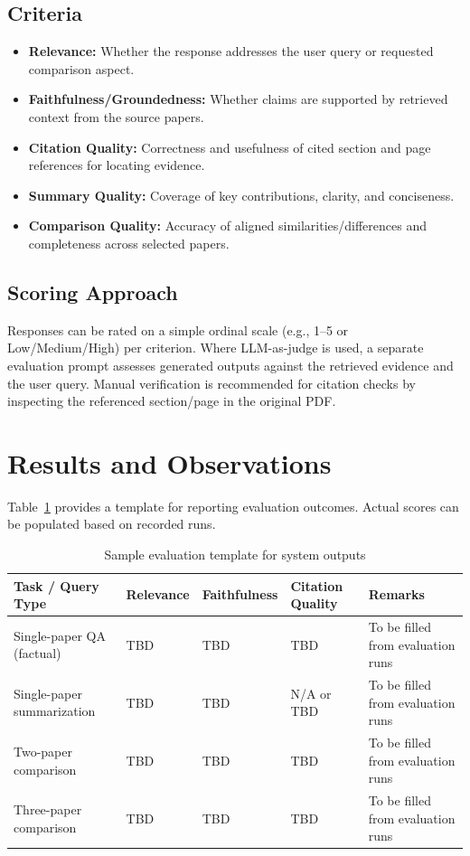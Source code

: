 \subsection{Criteria}
\begin{itemize}
    \item \textbf{Relevance:} Whether the response addresses the user query or requested comparison aspect.
    \item \textbf{Faithfulness/Groundedness:} Whether claims are supported by retrieved context from the source papers.
    \item \textbf{Citation Quality:} Correctness and usefulness of cited section and page references for locating evidence.
    \item \textbf{Summary Quality:} Coverage of key contributions, clarity, and conciseness.
    \item \textbf{Comparison Quality:} Accuracy of aligned similarities/differences and completeness across selected papers.
\end{itemize}

\subsection{Scoring Approach}
Responses can be rated on a simple ordinal scale (e.g., 1--5 or Low/Medium/High) per criterion. Where LLM-as-judge is used, a separate evaluation prompt assesses generated outputs against the retrieved evidence and the user query. Manual verification is recommended for citation checks by inspecting the referenced section/page in the original PDF.

\section{Results and Observations}
Table~\ref{tab:eval_results} provides a template for reporting evaluation outcomes. Actual scores can be populated based on recorded runs.

\begin{table}[H]
\centering
\caption{Sample evaluation template for system outputs}
\label{tab:eval_results}
\renewcommand{\arraystretch}{1.2}
\begin{tabular}{|p{3.2cm}|p{2.2cm}|p{2.2cm}|p{2.4cm}|p{3.0cm}|}
\hline
\textbf{Task / Query Type} & \textbf{Relevance} & \textbf{Faithfulness} & \textbf{Citation Quality} & \textbf{Remarks} \\
\hline
Single-paper QA (factual) & TBD & TBD & TBD & To be filled from evaluation runs \\
\hline
Single-paper summarization & TBD & TBD & N/A or TBD & To be filled from evaluation runs \\
\hline
Two-paper comparison & TBD & TBD & TBD & To be filled from evaluation runs \\
\hline
Three-paper comparison & TBD & TBD & TBD & To be filled from evaluation runs \\
\hline
\end{tabular}
\end{table}

